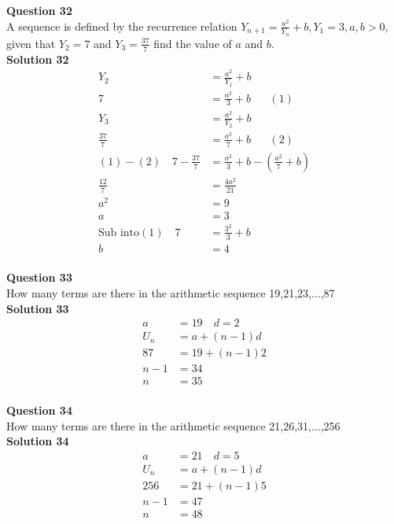 \documentclass{article}
\begin{document}
\noindent\textbf{Question 32}\\[5pt]
A sequence is defined by the recurrence relation $Y_{n+1}=\displaystyle\frac{a^2}{Y_n}+b, Y_1=3, a,b>0$, given that $Y_2=7$ and $Y_3=\displaystyle\frac{37}{7}$ find the value of $a$ and $b$.\\[5pt]
\noindent\textbf{Solution 32}\\[5pt]
\begin{align*}
Y_2&=\displaystyle\frac{a^2}{Y_1}+b\\[2pt]
7&=\displaystyle\frac{a^2}{3}+b\hspace{20pt}(1)\\[12pt]
Y_3&=\displaystyle\frac{a^2}{Y_2}+b\\[2pt]
\displaystyle\frac{37}{7}&=\displaystyle\frac{a^2}{7}+b\hspace{20pt}(2)\\[2pt]
(1)-(2)\quad 7-\displaystyle\frac{37}{7}&=\frac{a^2}{3}+b-\left(\frac{a^2}{7}+b\right)\\[2pt]
\displaystyle\frac{12}{7}&=\displaystyle\frac{4a^2}{21}\\[2pt]
a^2&=9\\[2pt]
a&=3\\[12pt]
\text{Sub into} (1)\quad 7&=\displaystyle\frac{3^2}{3}+b\\[2pt]
b&=4
\end{align*}\\[10pt]

\noindent\textbf{Question 33}\\[5pt]
How many terms are there in the arithmetic sequence 19,21,23,...,87\\[5pt]
\noindent\textbf{Solution 33}\\[5pt]
\begin{align*}
a&=19 \quad d=2\\[2pt]
U_n&=a+(n-1)d\\[2pt]
87&=19+(n-1)2\\[2pt]
n-1&=34\\[2pt]
n&=35
\end{align*}\\[10pt]

\noindent\textbf{Question 34}\\[5pt]
How many terms are there in the arithmetic sequence 21,26,31,...,256\\[5pt]
\noindent\textbf{Solution 34}\\[5pt]
\begin{align*}
a&=21 \quad d=5\\[2pt]
U_n&=a+(n-1)d\\[2pt]
256&=21+(n-1)5\\[2pt]
n-1&=47\\[2pt]
n&=48
\end{align*}\\[10pt]
\end{document}
